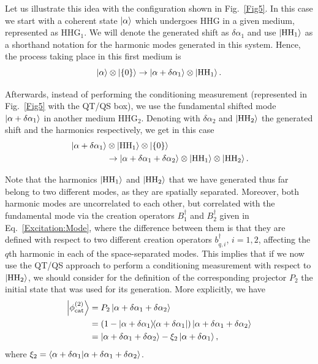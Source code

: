 Let us illustrate this idea with the configuration shown in Fig.~\ref{Fig5}. In this case we start with a coherent state $\ket{\alpha}$ which undergoes HHG in a given medium, represented as HHG$_1$. We will denote the generated shift as $\delta \alpha_1$ and use $\ket{\text{HH}_1}$ as a shorthand notation for the harmonic modes generated in this system. Hence, the process taking place in this first medium is
\begin{equation}
    \ket{\alpha} \otimes \ket{\{0\}}
    \rightarrow
    \ket{\alpha+\delta \alpha_1} \otimes \ket{\text{HH}_1}.
\end{equation}

Afterwards, instead of performing the conditioning measurement (represented in Fig.~\ref{Fig5} with the QT/QS box), we use the fundamental shifted mode $\ket{\alpha + \delta \alpha_1}$ in another medium HHG$_2$. Denoting with $\delta \alpha_2$ and $\ket{\text{HH}_2}$ the generated shift and the harmonics respectively, we get in this case
\begin{equation}
    \begin{aligned}
    &\ket{\alpha + \delta\alpha_1}
    \otimes \ket{\text{HH}_1}\otimes \ket{\{0\}}\\
    &\hspace{1.5cm}
    \to
    \ket{\alpha+\delta \alpha_1 + \delta\alpha_2} 
    \otimes \ket{\text{HH}_1}
    \otimes \ket{\text{HH}_2}.
    \end{aligned}
\end{equation}

Note that the harmonics $\ket{\text{HH}_1}$ and $\ket{\text{HH}_2}$ that we have generated thus far belong to two different modes, as they are spatially separated. Moreover, both harmonic modes are uncorrelated to each other, but correlated with the fundamental mode via the creation operators $B^\dagger_1$ and $B^\dagger_2$ given in Eq.~\eqref{Excitation:Mode}, where the difference between them is that they are defined with respect to two different creation operators $b^\dagger_{q,i}$, $i = 1, 2$, affecting the $q$th harmonic in each of the space-separated modes. This implies that if we now use the QT/QS approach to perform a conditioning measurement with respect to $\ket{\text{HH}_2}$, we should consider for the definition of the corresponding projector $P_2$ the initial state that was used for its generation. More explicitly, we have
\begin{equation}
    \begin{aligned}
    \ket{\phi_\text{cat}^{(2)}} &= P_2 \ket{\alpha + \delta \alpha_1 + \delta \alpha_2}\\
        &= 
        (1-\dyad{\alpha + \delta\alpha_1})\ket{\alpha + \delta \alpha_1 + \delta \alpha_2}\\
        &=
        \ket{\alpha + \delta \alpha_1 + \delta \alpha_2}
        - \xi_2 \ket{\alpha + \delta \alpha_1},
    \end{aligned}
\end{equation}
where $\xi_2 = \braket{\alpha+\delta\alpha_1}{\alpha+\delta\alpha_1+\delta\alpha_2}$.

